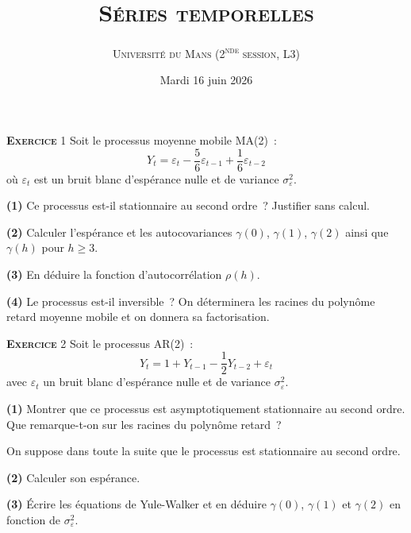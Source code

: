 \documentclass[10pt,a4paper,notitlepage,twocolumn]{article}
\newcommand{\exercice}[1]{\textsc{\textbf{Exercice}} #1}
\newcommand{\question}[1]{\textbf{(#1)}}
\begin{document}
\title{\textsc{Séries temporelles}}
\author{\textsc{Université du Mans (2\textsuperscript{nde} session, L3)}}
\date{Mardi 16 juin 2026}


\maketitle

\exercice{1} Soit le processus moyenne mobile MA(2)~:
\[
  Y_t = \varepsilon_t - \frac{5}{6}\varepsilon_{t-1} + \frac{1}{6}\varepsilon_{t-2}
\]
où $\varepsilon_t$ est un bruit blanc d'espérance nulle et de variance
$\sigma_{\varepsilon}^2$.\newline

\question{1} Ce processus est-il stationnaire au second ordre~?
Justifier sans calcul.\newline

\question{2} Calculer l'espérance et les autocovariances $\gamma(0)$,
$\gamma(1)$, $\gamma(2)$ ainsi que $\gamma(h)$ pour $h\geq 3$.\newline

\question{3} En déduire la fonction d'autocorrélation $\rho(h)$.\newline

\question{4} Le processus est-il inversible~? On déterminera les
racines du polynôme retard moyenne mobile et on donnera sa
factorisation.\newline

\bigskip

\exercice{2} Soit le processus AR(2)~:
\[
  Y_t = 1 + Y_{t-1} - \frac{1}{2}Y_{t-2} + \varepsilon_t
\]
avec $\varepsilon_t$ un bruit blanc d'espérance nulle et de variance
$\sigma_{\varepsilon}^2$.\newline

\question{1} Montrer que ce processus est asymptotiquement
stationnaire au second ordre. Que remarque-t-on sur les racines du
polynôme retard~?\newline

On suppose dans toute la suite que le processus est stationnaire au
second ordre.\newline

\question{2} Calculer son espérance.\newline

\question{3} Écrire les équations de Yule-Walker et en déduire
$\gamma(0)$, $\gamma(1)$ et $\gamma(2)$ en fonction de
$\sigma_{\varepsilon}^2$.\newline
\end{document}
